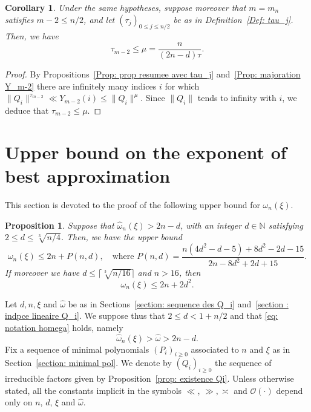 \documentclass[JEP,XML,SOM,Unicode,NoFloatCountersInSection,published]{cedram}
\newcommand\bN{\mathbb{N}}
\newcommand\GrO{\mathcal{O}}
\newcommand\homega{\widehat{\omega}}\newcommand\HH{\mathcal{H}}
\newcommand{\normH}[1]{\|#1\|}
\theoremstyle{definition}
\theoremstyle{plain}
\newtheorem{Prop}[Def]{Proposition}
\newtheorem{Cor}[Def]{Corollary}
\begin{document}
\begin{Cor}
\label{Cor: tau_m_2 < mu}
Under the same hypotheses, suppose moreover that $m=m_n$ satisfies $m-2\leq n/2$, and let $(\tau_j)_{0\leq j \leq n/2}$ be as in Definition~\ref{Def: tau_j}. Then, we have
\[
\tau_{m-2} \leq \mu = \frac{n}{(2n-d)\tau}.
\]
\end{Cor}

\begin{proof}
By Propositions~\ref{Prop: prop resumee avec tau_j} and~\ref{Prop: majoration Y_m-2} there are infinitely many indices $i$ for which $\normH{Q_i}^{\tau_{m-2}} \ll Y_{m-2}(i) \leq \normH{Q_i}^\mu$. Since $\normH{Q_i}$ tends to infinity with $i$, we deduce that $\tau_{m-2}\leq \mu$.
\end{proof}

\section{Upper bound on the exponent of best approximation}
\label{section: estimation de omega_n}

This section is devoted to the proof of the following upper bound for $\omega_n(\xi)$.

\begin{Prop}
\label{Prop: estimation omega_n(xi)}
Suppose that $\homega_n(\xi) > 2n-d$, with an integer $d\in\bN$ satisfying $\displaystyle 2 \leq d\leq \sqrt[3]{n/4}$. Then, we have the upper bound
\begin{equation*}
\omega_n(\xi)\leq 2n + P(n,d), \quad\textrm{where } P(n,d) = \frac{n(4d^2-d-5)+8d^2-2d-15}{2n-8d^2+2d+15}.
\end{equation*}
If moreover we have $d\leq \Big\lceil\sqrt[3]{n/16} \Big\rceil$ and $n > 16$, then
\begin{equation*}
\omega_n(\xi)\leq 2n + 2d^2.
\end{equation*}
\end{Prop}

Let $d,n,\xi$ and $\homega$ be as in Sections~\ref{section: sequence des Q_i} and~\ref{section : indpce lineaire Q_i}. We suppose thus that $2\leq d < 1+n/2$ and that \eqref{eq: notation homega} holds, namely
\[
\homega_n(\xi) > \homega > 2n -d.
\]
Fix a sequence of minimal polynomials $(P_i)_{i\geq 0}$ associated to $n$ and $\xi$ as in Section~\ref{section: minimal pol}. We denote by $(Q_i)_{i\geq 0}$ the sequence of irreducible factors given by Proposition~\ref{prop: existence Qi}. Unless otherwise stated, all the constants implicit in the symbols $\ll$, $\gg, \asymp$ and $\GrO(\cdot)$ depend only on $n$, $d$, $\xi$ and $\homega$.
\end{document}
